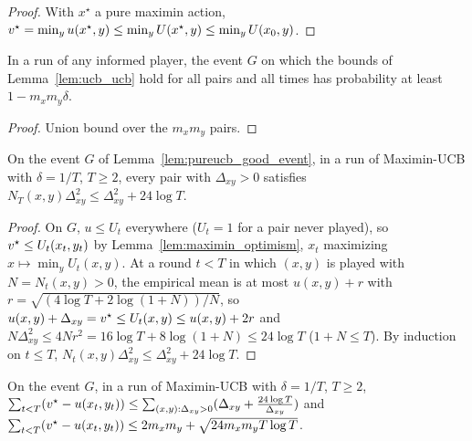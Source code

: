 \begin{proof}
  \leanok
  With $x^\star$ a pure maximin action,
  $v^\star = \min_y u(x^\star, y) \le \min_y U(x^\star, y) \le \min_y U(x_0, y)$.
\end{proof}

\begin{lemma}
  \label{lem:pureucb_good_event}
  \leanok
  In a run of any informed player, the event $G$ on which the bounds of
  Lemma~\ref{lem:ucb_ucb} hold for all pairs and all times has probability at least
  $1 - m_x m_y \delta$.
\end{lemma}

\begin{proof}
  \leanok
  Union bound over the $m_x m_y$ pairs.
\end{proof}

\begin{lemma}
  \label{lem:pureucb_count}
  \leanok
  On the event $G$ of Lemma~\ref{lem:pureucb_good_event}, in a run of Maximin-UCB with
  $\delta = 1/T$, $T \ge 2$, every pair with $\Delta_{xy} > 0$ satisfies
  $N_T(x, y) \Delta_{xy}^2 \le \Delta_{xy}^2 + 24 \log T$.
\end{lemma}

\begin{proof}
  \leanok
  On $G$, $u \le U_t$ everywhere ($U_t = 1$ for a pair never played), so $v^\star \le U_t(x_t, y_t)$
  by Lemma~\ref{lem:maximin_optimism}, $x_t$ maximizing $x \mapsto \min_y U_t(x, y)$. At a round
  $t < T$ in which $(x, y)$ is played with $N = N_t(x, y) > 0$, the empirical mean is at most
  $u(x, y) + r$ with $r = \sqrt{(4 \log T + 2 \log(1 + N))/N}$, so
  $u(x, y) + \Delta_{xy} = v^\star \le U_t(x, y) \le u(x, y) + 2 r$ and
  $N \Delta_{xy}^2 \le 4 N r^2 = 16 \log T + 8 \log(1 + N) \le 24 \log T$ ($1 + N \le T$). By
  induction on $t \le T$, $N_t(x, y) \Delta_{xy}^2 \le \Delta_{xy}^2 + 24 \log T$.
\end{proof}

\begin{lemma}
  \label{lem:pureucb_pathwise}
  \leanok
  On the event $G$, in a run of Maximin-UCB with $\delta = 1/T$, $T \ge 2$,
  $\sum_{t < T} (v^\star - u(x_t, y_t)) \le \sum_{(x, y) : \Delta_{xy} > 0} (\Delta_{xy} +
  \frac{24 \log T}{\Delta_{xy}})$ and
  $\sum_{t < T} (v^\star - u(x_t, y_t)) \le 2 m_x m_y + \sqrt{24 m_x m_y T \log T}$.
\end{lemma}

